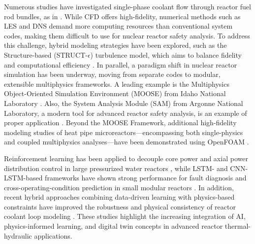 \documentclass[review]{elsarticle}
\theoremstyle{definition}
\theoremstyle{definition}
\theoremstyle{remark}
\begin{document}
Numerous studies have investigated single-phase coolant flow through reactor fuel rod bundles, as in \cite{Wang2024}.  While CFD offers high-fidelity, numerical methods such as LES and DNS demand more computing resources than conventional system codes, making them difficult to use for nuclear reactor safety analysis. To address this challenge, hybrid modeling strategies have been explored, such as the Structure-based (STRUCT-$\epsilon$) turbulence model, which aims to balance fidelity and computational efficiency \cite{Feng2021, pham2024struct}.
In parallel, a paradigm shift in nuclear reactor simulation has been underway, moving from separate codes to modular, extensible multiphysics frameworks. A leading example is the {M}ultiphysics {O}bject-{O}riented {S}imulation {E}nvironment ({MOOSE}) from {I}daho {N}ational {L}aboratory \cite{harbour2025moose}. Also, the {S}ystem {A}nalysis {M}odule ({SAM}) from {A}rgonne {N}ational {L}aboratory, a modern tool for advanced reactor safety analysis, is an example of proper application \cite{osti_1671335}. Beyond the MOOSE Framework, additional high-fidelity modeling studies of heat pipe microreactors—encompassing both single-physics and coupled multiphysics analyses—have been demonstrated using OpenFOAM \cite{price2023thermal,price2024multiphysics}.

Reinforcement learning has been applied to decouple core power and axial power distribution control in large pressurized water reactors \cite{wang2024decoupling}, while LSTM- and CNN-LSTM-based frameworks have shown strong performance for fault diagnosis and cross-operating-condition prediction in small modular reactors \cite{wang2022fault,luo2024cross}. In addition, recent hybrid approaches combining data-driven learning with physics-based constraints have improved the robustness and physical consistency of reactor coolant loop modeling \cite{yuan2026hybrid}. These studies highlight the increasing integration of AI, physics-informed learning, and digital twin concepts in advanced reactor thermal-hydraulic applications.
\end{document}
